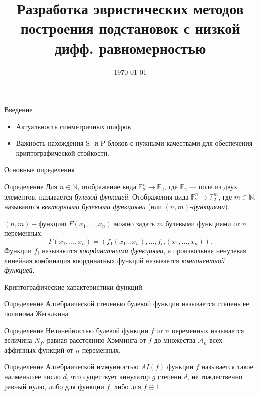 \documentclass{beamer}
\title{Разработка эвристических методов построения подстановок с низкой дифф. равномерностью}
\author{\and}
\institute{Летняя школа-конференция <<Криптография и информационная безопасность>>}
\date[]{\today}
\begin{document}
\justifying
\begin{frame}
    \titlepage
\end{frame}

\begin{frame}{Введение}
\begin{itemize}
    \item Актуальность симметричных шифров
    \item Важность нахождения S- и P-блоков с нужными качествами для обеспечения криптографической стойкости.
\end{itemize}
\end{frame}

\begin{frame}{Основные определения}

\begin{block}{Определение}
    Для $n \in \mathbb{N}$, отображение вида $\mathbb{F}_{2}^{n} \xrightarrow{} \mathbb{F}_{2}$, где $\mathbb{F}_{2}$ --- поле из двух элементов, называется \textit{булевой функцией}.
    Отображения вида $\mathbb{F}_{2}^{n} \xrightarrow{} \mathbb{F}_{2}^{m}$, где $m \in \mathbb{N}$, называются \textit{векторными булевыми функциями} (или $(n, m)$-\textit{функциями}).
\end{block}
$(n,m)-$функцию $F(x_1,...,x_n)$ можно задать $m$ булевыми функциями от $n$ переменных:
$$F(x_1, \dots ,x_n) = (f_1(x_1\dots x_n),\dots,f_m(x_1,\dots, x_n)).$$
Функции $f_i$ называются \textit{координатными функциями}, а произвольная ненулевая линейная комбинация координатных функций называется \textit{компонентной функцией}.
\end{frame}



\begin{frame}{Криптографические характеристики функций}
\begin{block}{Определение}
Алгебраической степенью булевой функции называется степень ее полинома Жегалкина.
\end{block}
\begin{block}{Определение}
Нелинейностью булевой функции $f$ от $n$ переменных называется величина $N_f$, равная расстоянию Хэмминга от $f$ до множества $\mathcal{A}_n$ всех аффинных функций от $n$ переменных.
\end{block}

\begin{block}{Определение}
Алгебраической иммунностью $AI(f)$ функции $f$ называется такое наименьшее число $d$, что существует аннулатор $g$ степени $d$, не тождественно равный нулю, либо для функции $f$, либо для $f \oplus 1$
\end{block}
\end{frame}
\end{document}
